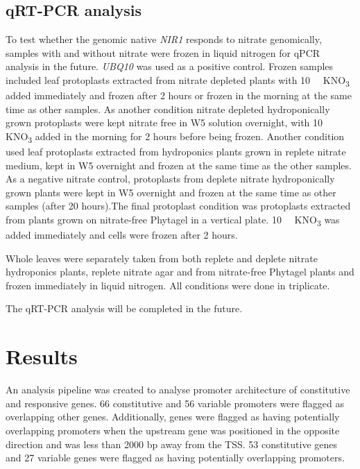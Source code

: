 \subsection{qRT-PCR analysis}
{\label{qrt-pcr-analysis}}

To test whether the genomic native \textit{NIR1} responds to nitrate
genomically, samples with and without nitrate were frozen in liquid
nitrogen for qPCR analysis in the future. \textit{UBQ10} was used as a
positive control. Frozen samples included leaf protoplasts extracted
from nitrate depleted plants with \SI{10}{\milli\Molar} KNO\textsubscript{3} added immediately and frozen after 2 hours or frozen in the morning at the
same time as other samples. As another condition nitrate depleted
hydroponically grown protoplasts were kept nitrate free in W5 solution
overnight, with \SI{10}{\milli\Molar} KNO\textsubscript{3} added in the morning for 2
hours before being frozen. Another condition used leaf protoplasts
extracted from hydroponics plants grown in replete nitrate medium, kept in W5 overnight and frozen at the same time as the other samples. As a negative nitrate control, protoplasts from deplete nitrate
hydroponically grown plants were kept in W5 overnight and frozen at the same time as other samples (after 20 hours).The final protoplast
condition was protoplasts extracted from plants grown on nitrate\hyp{}free
Phytagel in a vertical plate. \SI{10}{\milli\Molar} KNO\textsubscript{3} was added
immediately and cells were frozen after 2 hours.

Whole leaves were separately taken from both replete and deplete nitrate hydroponics plants, replete nitrate agar and from nitrate\hyp{}free Phytagel plants and frozen immediately in liquid nitrogen. All conditions were done in triplicate.

The qRT\hyp{}PCR analysis will be completed in the future.

\section{Results}\label{results}

An analysis pipeline was created to analyse promoter architecture of constitutive and responsive genes.
66 constitutive and 56 variable promoters were flagged as overlapping other genes.
Additionally, genes were flagged as having potentially overlapping promoters when the upstream gene was positioned in the opposite direction and was less than 2000 bp away from the TSS.
53 constitutive genes and 27 variable genes were flagged as having
potentially overlapping promoters.


